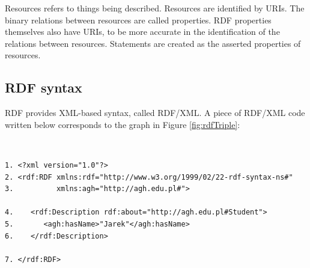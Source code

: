 \newpage

\noindent Resources refers to things being described. Resources are identified by URIs. The binary relations between resources are called properties. RDF properties themselves also have URIs, to be more accurate in the identification of the relations between resources. Statements are created as the asserted properties of resources.

\subsection{RDF syntax}
\label{sub:rdfSyntax}

RDF provides XML-based syntax, called RDF\slash XML. A piece of RDF\slash XML code written below corresponds to the graph in Figure \ref{fig:rdfTriple}:

{\tt \small
\begin{verbatim}
1. <?xml version="1.0"?>
2. <rdf:RDF xmlns:rdf="http://www.w3.org/1999/02/22-rdf-syntax-ns#"
3.          xmlns:agh="http://agh.edu.pl#">

4.    <rdf:Description rdf:about="http://agh.edu.pl#Student">
5.       <agh:hasName>"Jarek"</agh:hasName>
6.    </rdf:Description>

7. </rdf:RDF>
\end{verbatim}
}

